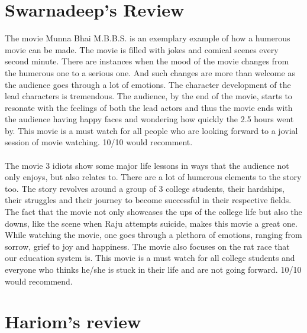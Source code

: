 \documentclass{article}
\begin{document}
\section{Swarnadeep's Review}
The movie Munna Bhai M.B.B.S. is an exemplary example of how a humerous movie can be made. The movie is filled with jokes and comical scenes every second minute. There are instances when the mood of the movie changes from the humerous one to a serious one. And such changes are more than welcome as the audience goes through a lot of emotions. The character development of the lead characters is tremendous. The audience, by the end of the movie, starts to resonate with the feelings of both the lead actors and thus the movie ends with the audience having happy faces and wondering how quickly the 2.5 hours went by. This movie is a must watch for all people who are looking forward to a jovial session of movie watching. 10/10 would recomment. \\ \\
The movie 3 idiots show some major life lessons in ways that the audience not only enjoys, but also relates to. There are a lot of humerous elements to the story too. The story revolves around a group of 3 college students, their hardships, their struggles and their journey to become successful in their respective fields. The fact that the movie not only showcases the ups of the college life but also the downs, like the scene when Raju attempts suicide, makes this movie a great one. While watching the movie, one goes through a plethora of emotions, ranging from sorrow, grief to joy and happiness. The movie also focuses on the rat race that our education system is. This movie is a must watch for all college students and everyone who thinks he/she is stuck in their life and are not going forward. 10/10 would recommend.

\section{Hariom's review}
\end{document}
